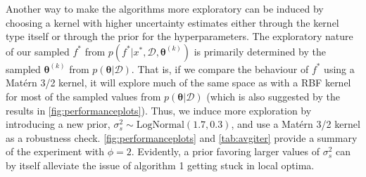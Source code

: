 Another way to make the algorithms more exploratory can be induced by choosing a kernel with higher uncertainty estimates either through the kernel type itself or through the prior for the hyperparameters. The exploratory nature of our sampled $f^*$ from $p(f^*|x^*,\mathcal{D}, \bm{\theta}^{(k)})$ is primarily determined by the sampled $\bm{\theta}^{(k)}$ from $p(\bm{\theta}|\mathcal{D})$. That is, if we compare the behaviour of $f^*$ using a Matérn 3/2 kernel, it will explore much of the same space as with a RBF kernel for most of the sampled values from $p(\bm{\theta}|\mathcal{D})$ (which is also suggested by the results in \autoref{fig:performanceplots}). Thus, we induce more exploration by introducing a new prior, $\sigma_\mathit{s}^2\sim\text{LogNormal}(1.7, 0.3)$, and use a Matérn 3/2 kernel as a robustness check. \autoref{fig:performanceplots} and \autoref{tab:avgiter} provide a summary of the experiment with $\phi=2$. Evidently, a prior favoring larger values of $\sigma_\mathit{s}^2$ can by itself alleviate the issue of algorithm 1 getting stuck in local optima.

